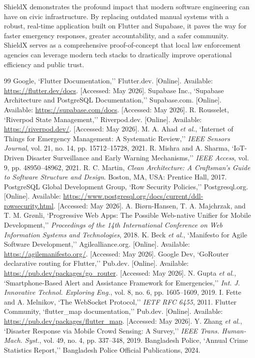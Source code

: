 \documentclass[12pt, a4paper, twoside]{report}
\renewcommand{\bibname}{References}
\begin{document}
\vspace{0.5cm}
ShieldX demonstrates the profound impact that modern software engineering can have on civic infrastructure. By replacing outdated manual systems with a robust, real-time application built on Flutter and Supabase, it paves the way for faster emergency responses, greater accountability, and a safer community. ShieldX serves as a comprehensive proof-of-concept that local law enforcement agencies can leverage modern tech stacks to drastically improve operational efficiency and public trust.
\renewcommand{\bibname}{References}
\begin{thebibliography}{99}
 Google, `Flutter Documentation,'' Flutter.dev. [Online]. Available: \url{https://flutter.dev/docs}. [Accessed: May 2026].
 Supabase Inc., `Supabase Architecture and PostgreSQL Documentation,'' Supabase.com. [Online]. Available: \url{https://supabase.com/docs}. [Accessed: May 2026].
 R. Rousselet, `Riverpod State Management,'' Riverpod.dev. [Online]. Available: \url{https://riverpod.dev/}. [Accessed: May 2026].
 M. A. Ahad \textit{et al.}, `Internet of Things for Emergency Management: A Systematic Review,'' \textit{IEEE Sensors Journal}, vol. 21, no. 14, pp. 15712--15728, 2021.
 R. Mishra and A. Sharma, `IoT-Driven Disaster Surveillance and Early Warning Mechanisms,'' \textit{IEEE Access}, vol. 9, pp. 48950--48962, 2021.
 R. C. Martin, \textit{Clean Architecture: A Craftsman's Guide to Software Structure and Design}. Boston, MA, USA: Prentice Hall, 2017.
 PostgreSQL Global Development Group, `Row Security Policies,'' Postgresql.org. [Online]. Available: \url{https://www.postgresql.org/docs/current/ddl-rowsecurity.html}. [Accessed: May 2026].
 A. Biørn-Hansen, T. A. Majchrzak, and T. M. Grønli, `Progressive Web Apps: The Possible Web-native Unifier for Mobile Development,'' \textit{Proceedings of the 14th International Conference on Web Information Systems and Technologies}, 2018.
 K. Beck \textit{et al.}, `Manifesto for Agile Software Development,'' Agilealliance.org. [Online]. Available: \url{https://agilemanifesto.org/}. [Accessed: May 2026].
 Google Dev, `GoRouter declarative routing for Flutter,'' Pub.dev. [Online]. Available: \url{https://pub.dev/packages/go_router}. [Accessed: May 2026].
 N. Gupta \textit{et al.}, `Smartphone-Based Alert and Assistance Framework for Emergencies,'' \textit{Int. J. Innovative Technol. Exploring Eng.}, vol. 8, no. 6, pp. 1605--1609, 2019.
 I. Fette and A. Melnikov, `The WebSocket Protocol,'' \textit{IETF RFC 6455}, 2011.
 Flutter Community, `flutter\_map documentation,'' Pub.dev. [Online]. Available: \url{https://pub.dev/packages/flutter_map}. [Accessed: May 2026].
 Y. Zhang \textit{et al.}, `Disaster Response via Mobile Crowd Sensing: A Survey,'' \textit{IEEE Trans. Human-Mach. Syst.}, vol. 49, no. 4, pp. 337--348, 2019.
 Bangladesh Police, `Annual Crime Statistics Report,'' Bangladesh Police Official Publications, 2024.
\end{thebibliography}
\end{document}
